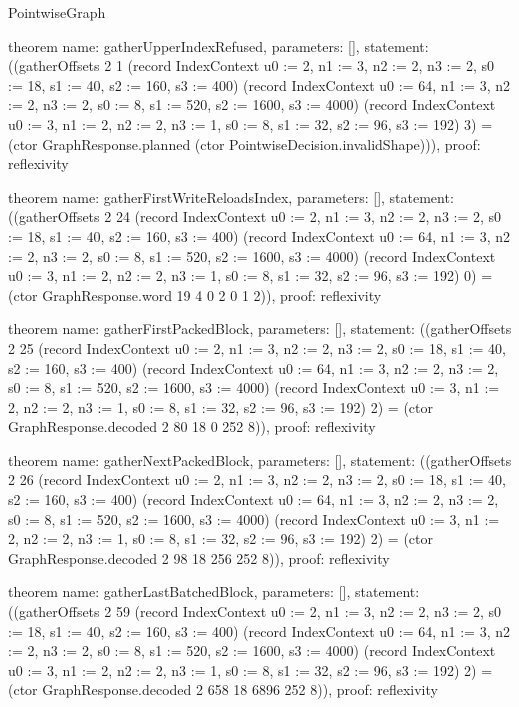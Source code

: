 \begin{lexlean}{PointwiseGraph}
\begin{semanticmodule}
theorem{
  name: gatherUpperIndexRefused,
  parameters: [],
  statement: ((gatherOffsets 2 1 (record IndexContext {u0 := 2, n1 := 3, n2 := 2, n3 := 2, s0 := 18, s1 := 40, s2 := 160, s3 := 400}) (record IndexContext {u0 := 64, n1 := 3, n2 := 2, n3 := 2, s0 := 8, s1 := 520, s2 := 1600, s3 := 4000}) (record IndexContext {u0 := 3, n1 := 2, n2 := 2, n3 := 1, s0 := 8, s1 := 32, s2 := 96, s3 := 192}) 3) = (ctor GraphResponse.planned (ctor PointwiseDecision.invalidShape))),
  proof: reflexivity{}
}

theorem{
  name: gatherFirstWriteReloadsIndex,
  parameters: [],
  statement: ((gatherOffsets 2 24 (record IndexContext {u0 := 2, n1 := 3, n2 := 2, n3 := 2, s0 := 18, s1 := 40, s2 := 160, s3 := 400}) (record IndexContext {u0 := 64, n1 := 3, n2 := 2, n3 := 2, s0 := 8, s1 := 520, s2 := 1600, s3 := 4000}) (record IndexContext {u0 := 3, n1 := 2, n2 := 2, n3 := 1, s0 := 8, s1 := 32, s2 := 96, s3 := 192}) 0) = (ctor GraphResponse.word 19 4 0 2 0 1 2)),
  proof: reflexivity{}
}

theorem{
  name: gatherFirstPackedBlock,
  parameters: [],
  statement: ((gatherOffsets 2 25 (record IndexContext {u0 := 2, n1 := 3, n2 := 2, n3 := 2, s0 := 18, s1 := 40, s2 := 160, s3 := 400}) (record IndexContext {u0 := 64, n1 := 3, n2 := 2, n3 := 2, s0 := 8, s1 := 520, s2 := 1600, s3 := 4000}) (record IndexContext {u0 := 3, n1 := 2, n2 := 2, n3 := 1, s0 := 8, s1 := 32, s2 := 96, s3 := 192}) 2) = (ctor GraphResponse.decoded 2 80 18 0 252 8)),
  proof: reflexivity{}
}

theorem{
  name: gatherNextPackedBlock,
  parameters: [],
  statement: ((gatherOffsets 2 26 (record IndexContext {u0 := 2, n1 := 3, n2 := 2, n3 := 2, s0 := 18, s1 := 40, s2 := 160, s3 := 400}) (record IndexContext {u0 := 64, n1 := 3, n2 := 2, n3 := 2, s0 := 8, s1 := 520, s2 := 1600, s3 := 4000}) (record IndexContext {u0 := 3, n1 := 2, n2 := 2, n3 := 1, s0 := 8, s1 := 32, s2 := 96, s3 := 192}) 2) = (ctor GraphResponse.decoded 2 98 18 256 252 8)),
  proof: reflexivity{}
}

theorem{
  name: gatherLastBatchedBlock,
  parameters: [],
  statement: ((gatherOffsets 2 59 (record IndexContext {u0 := 2, n1 := 3, n2 := 2, n3 := 2, s0 := 18, s1 := 40, s2 := 160, s3 := 400}) (record IndexContext {u0 := 64, n1 := 3, n2 := 2, n3 := 2, s0 := 8, s1 := 520, s2 := 1600, s3 := 4000}) (record IndexContext {u0 := 3, n1 := 2, n2 := 2, n3 := 1, s0 := 8, s1 := 32, s2 := 96, s3 := 192}) 2) = (ctor GraphResponse.decoded 2 658 18 6896 252 8)),
  proof: reflexivity{}
}


\end{semanticmodule}
\end{lexlean}
